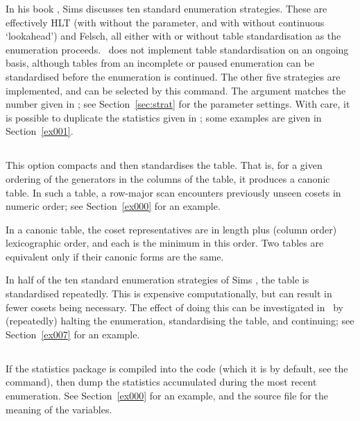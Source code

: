 In his book \cite{Sim94}, Sims discusses ten standard enumeration
  strategies.
These are effectively HLT (with \amp without the  parameter,
  and with \amp without continuous `lookahead') and Felsch, all either with
  or without table standardisation as the enumeration proceeds.
\ace\ does not implement table standardisation on an ongoing basis, 
  although tables from an incomplete or paused enumeration can be 
  standardised before the enumeration is continued.
The other five strategies are implemented, and can be selected by this
  command.
The argument matches the number given in \cite[\S5.5]{Sim94}; see
  Section~\ref{sec:strat} for the parameter settings.
With care, it is possible to duplicate the statistics given in \cite{Sim94};
  some examples are given in Section~\ref{ex001}.

\subsection{}

This option compacts and then standardises the table.
That is, for a given ordering of the generators in the columns of the
  table, it produces a canonic table.
In such a table, a row-major scan encounters previously unseen cosets in
  numeric order; see Section~\ref{ex000} for an example.

In a canonic table, the coset representatives are in length plus (column
  order) lexicographic order, and each is the minimum in this order.
Two tables are equivalent only if their canonic forms are the same.

In half of the ten standard enumeration strategies of Sims \cite{Sim94}, the
  table is standardised repeatedly.
This is expensive computationally, but can result in fewer cosets being
  necessary.
The effect of doing this can be investigated in \ace\ by (repeatedly)
  halting the enumeration, standardising the table, and continuing; see 
  Section~\ref{ex007} for an example.

\subsection{}

If the statistics package is compiled into the code (which it is by
  default, see the  command), then dump the statistics
  accumulated during the most recent enumeration.
See Section~\ref{ex000} for an example, and the  source file
  for the meaning of the variables.

